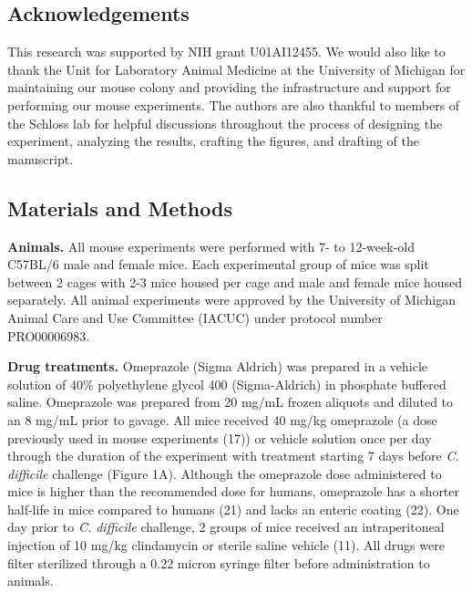 \documentclass[11pt,]{article}
\begin{document}
\subsection{Acknowledgements}\label{acknowledgements}

This research was supported by NIH grant U01AI12455. We would also like
to thank the Unit for Laboratory Animal Medicine at the University of
Michigan for maintaining our mouse colony and providing the
infrastructure and support for performing our mouse experiments. The
authors are also thankful to members of the Schloss lab for helpful
discussions throughout the process of designing the experiment,
analyzing the results, crafting the figures, and drafting of the
manuscript.

\newpage

\subsection{Materials and Methods}\label{materials-and-methods}

\textbf{Animals.} All mouse experiments were performed with 7- to
12-week-old C57BL/6 male and female mice. Each experimental group of
mice was split between 2 cages with 2-3 mice housed per cage and male
and female mice housed separately. All animal experiments were approved
by the University of Michigan Animal Care and Use Committee (IACUC)
under protocol number PRO00006983.

\textbf{Drug treatments.} Omeprazole (Sigma Aldrich) was prepared in a
vehicle solution of 40\% polyethylene glycol 400 (Sigma-Aldrich) in
phosphate buffered saline. Omeprazole was prepared from 20 mg/mL frozen
aliquots and diluted to an 8 mg/mL prior to gavage. All mice received 40
mg/kg omeprazole (a dose previously used in mouse experiments (17)) or
vehicle solution once per day through the duration of the experiment
with treatment starting 7 days before \emph{C. difficile} challenge
(Figure 1A). Although the omeprazole dose administered to mice is higher
than the recommended dose for humans, omeprazole has a shorter half-life
in mice compared to humans (21) and lacks an enteric coating (22). One
day prior to \emph{C. difficile} challenge, 2 groups of mice received an
intraperitoneal injection of 10 mg/kg clindamycin or sterile saline
vehicle (11). All drugs were filter sterilized through a 0.22 micron
syringe filter before administration to animals.
\end{document}
